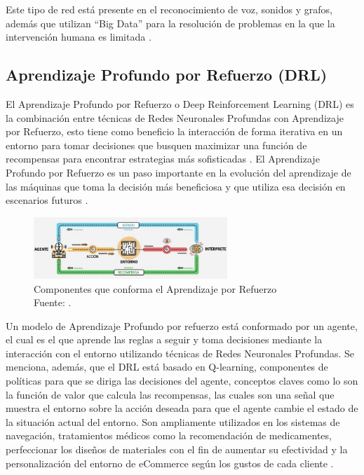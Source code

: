 Este tipo de red está presente en el reconocimiento de voz, sonidos y grafos, además que utilizan “Big Data” para la resolución de problemas en la que la intervención humana es limitada \parencite{gl_bot}. 


\subsection{Aprendizaje Profundo por Refuerzo (DRL)}
El Aprendizaje Profundo por Refuerzo o Deep Reinforcement Learning (DRL) es la combinación entre técnicas de Redes Neuronales Profundas con Aprendizaje por Refuerzo, esto tiene como beneficio la interacción de forma iterativa en un entorno para tomar decisiones que busquen maximizar una función de recompensas para encontrar estrategias más sofisticadas \parencite{gl_geekrein}. El Aprendizaje Profundo por Refuerzo es un paso importante en la evolución del aprendizaje de las máquinas que toma la decisión más beneficiosa y que utiliza esa decisión en escenarios futuros \parencite{gl_iic}.
\begin{figure}[h]
	\begin{center}
		\includegraphics[width=0.65\textwidth]{2/MT/4.jpg}
		\caption{Componentes que conforma el Aprendizaje por Refuerzo \\
			Fuente: \citep*{gl_iic}. }
		\label{1:fig2}
	\end{center}
\end{figure}

 Un modelo de Aprendizaje Profundo por refuerzo está conformado por un agente, el cual es el que aprende las reglas a seguir y toma decisiones mediante la interacción con el entorno utilizando técnicas de Redes Neuronales Profundas.  Se menciona, además, que el DRL está basado en Q-learning, componentes de políticas para que se diriga las decisiones del agente, conceptos claves como lo son la función de valor que calcula las recompensas, las cuales son una señal que muestra el entorno sobre la acción deseada para que el agente cambie el estado de la situación actual del entorno. Son ampliamente utilizados en los sistemas de navegación, tratamientos médicos como la recomendación de medicamentes, perfeccionar los diseños de materiales con el fin de aumentar su efectividad y la personalización del entorno de eCommerce según los gustos de cada cliente \parencite{gl_iic}.
 
